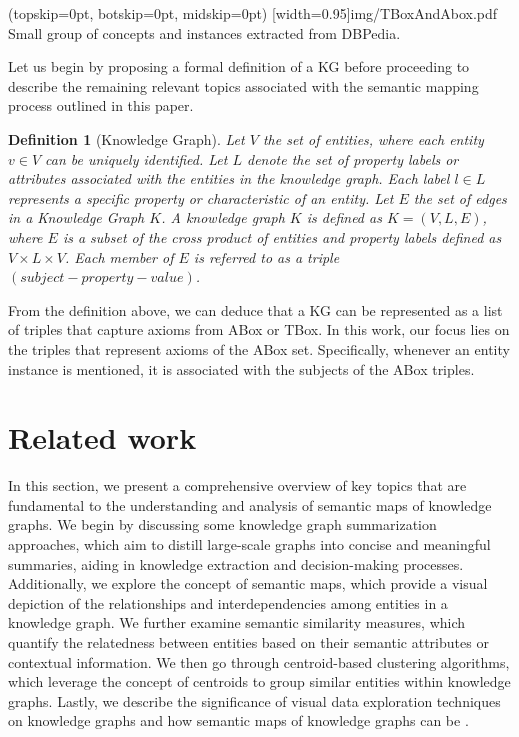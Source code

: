 \documentclass{ieeeaccess}
\newtheorem{Definition}{Definition}
\begin{document}
\Figure[h!](topskip=0pt, botskip=0pt, midskip=0pt)
[width=0.95\textwidth]{img/TBoxAndAbox.pdf}
{Small group of concepts and instances extracted from 
DBPedia. \label{Fig:TboxAndAbox}}

Let us begin by proposing a formal definition
of a KG before proceeding to describe the 
remaining relevant topics associated 
with the semantic mapping process outlined in 
this paper.

\begin{Definition}[Knowledge Graph]
Let $V$ the set of entities, where each entity 
$v \in V$ can be uniquely identified. Let $L$ denote
the set of property labels or attributes associated 
with the entities in the knowledge graph. Each label 
$l \in L$ represents a specific property or 
characteristic of an entity. Let $E$ the set of edges
in a Knowledge Graph $K$. A knowledge graph $K$ is defined
as $K = (V, L, E)$, where $E$ is a subset of the cross
product of entities and property labels defined as 
$V \times L \times V$. Each member of $E$ is referred 
to as a triple $(subject-property-value)$.
\end{Definition}

From the definition above, we can deduce that a KG
can be represented as a list of triples that capture 
axioms from ABox or TBox. In this work, our focus lies
on the triples that represent axioms of the ABox set. 
Specifically, whenever an entity instance is mentioned, 
it is associated with the subjects of the ABox triples.

\section{Related work}
\label{sec:related}

In this section, we present a comprehensive overview 
of key topics that are fundamental to the understanding
and analysis of semantic maps of knowledge graphs. We 
begin by discussing some knowledge graph summarization approaches, 
which aim to distill large-scale graphs into concise 
and meaningful summaries, aiding in knowledge 
extraction and decision-making processes. Additionally, 
we explore the concept of semantic maps, which provide 
a visual depiction of the relationships and 
interdependencies among entities in a knowledge graph. 
We further examine semantic similarity measures, which 
quantify the relatedness between entities based on 
their semantic attributes or contextual information. 
We then go through centroid-based clustering 
algorithms, which leverage the concept of centroids to 
group similar entities within knowledge graphs. Lastly, 
we describe the significance of visual data 
exploration techniques on knowledge graphs and how semantic
maps of knowledge graphs can be .
\end{document}
